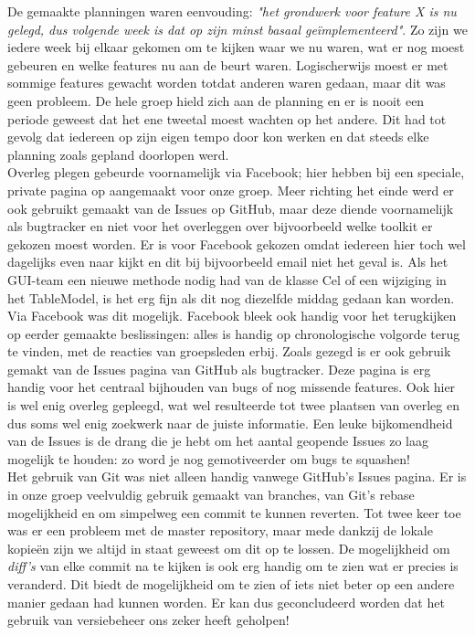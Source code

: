 \documentclass[a4paper,11pt]{article}
\begin{document}
De gemaakte planningen waren eenvouding: \textit{"het grondwerk voor feature X is nu gelegd, dus volgende week is dat op zijn minst basaal geïmplementeerd"}. Zo zijn we iedere week bij elkaar gekomen om te kijken waar we nu waren, wat er nog moest gebeuren en welke features nu aan de beurt waren. Logischerwijs moest er met sommige features gewacht worden totdat anderen waren gedaan, maar dit was geen probleem. De hele groep hield zich aan de planning en er is nooit een periode geweest dat het ene tweetal moest wachten op het andere. Dit had tot gevolg dat iedereen op zijn eigen tempo door kon werken en dat steeds elke planning zoals gepland doorlopen werd.\\

Overleg plegen gebeurde voornamelijk via Facebook; hier hebben bij een speciale, private pagina op aangemaakt voor onze groep. Meer richting het einde werd er ook gebruikt gemaakt van de Issues op GitHub, maar deze diende voornamelijk als bugtracker en niet voor het overleggen over bijvoorbeeld welke toolkit er gekozen moest worden. Er is voor Facebook gekozen omdat iedereen hier toch wel dagelijks even naar kijkt en dit bij bijvoorbeeld email niet het geval is. Als het GUI-team een nieuwe methode nodig had van de klasse Cel of een wijziging in het TableModel, is het erg fijn als dit nog diezelfde middag gedaan kan worden. Via Facebook was dit mogelijk. Facebook bleek ook handig voor het terugkijken op eerder gemaakte beslissingen: alles is handig op chronologische volgorde terug te vinden, met de reacties van groepsleden erbij. Zoals gezegd is er ook gebruik gemakt van de Issues pagina van GitHub als bugtracker. Deze pagina is erg handig voor het centraal bijhouden van bugs of nog missende features. Ook hier is wel enig overleg gepleegd, wat wel resulteerde tot twee plaatsen van overleg en dus soms wel enig zoekwerk naar de juiste informatie. Een leuke bijkomendheid van de Issues is de drang die je hebt om het aantal geopende Issues zo laag mogelijk te houden: zo word je nog gemotiveerder om bugs te squashen!\\

Het gebruik van Git was niet alleen handig vanwege GitHub’s Issues pagina. Er is in onze groep veelvuldig gebruik gemaakt van branches, van Git’s rebase mogelijkheid en om simpelweg een commit te kunnen reverten. Tot twee keer toe was er een probleem met de master repository, maar mede dankzij de lokale kopieën zijn we altijd in staat geweest om dit op te lossen. De mogelijkheid om \textit{diff’s} van elke commit na te kijken is ook erg handig om te zien wat er precies is veranderd. Dit biedt de mogelijkheid om te zien of iets niet beter op een andere manier gedaan had kunnen worden. Er kan dus geconcludeerd worden dat het gebruik van versiebeheer ons zeker heeft geholpen!\\
\end{document}
